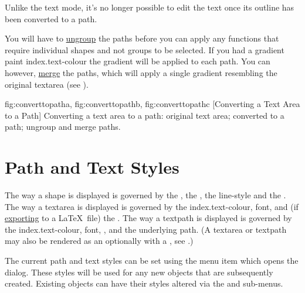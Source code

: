 \begin{information}
Unlike the text  mode, it's no longer possible to
edit the text once its outline has been converted to a path.
\end{information}

You will have to \hyperref[sec:grouping]{ungroup} the
\glspl*{path} before you can apply any functions that require
individual \glspl{shape} and not \glspl{group} to be selected.  If you
had a gradient paint \gls{index.text-colour} the gradient will be
applied to each \gls*{path}. You can however,
\hyperref[sec:mergepaths]{merge} the \glspl*{path}, which will apply
a single gradient resembling the original \gls*{textarea} (see
).

{
  {fig:converttopatha}{}{},
  {fig:converttopathb}{}{},
  {fig:converttopathc}{}{}
}
[Converting a Text Area to a Path]
{Converting a text area to a path:
 original text area;
 converted to a path;
 ungroup and merge paths.}



\chapter{Path and Text Styles}\label{sec:styles}

The way a \gls{shape} is displayed is governed by the 
, the , the 
\gls{line-style} and the . 
The way a \gls{textarea} is displayed is governed by the
\gls{index.text-colour}, \gls{font},  
and (if \hyperref[sec:exportimage]{exporting} to a \LaTeX\ file) the
. The way a \gls{textpath} is displayed is governed
by the \gls{index.text-colour}, \gls{font}, ,
 and the underlying path. (A
\gls*{textarea} or \gls*{textpath} may also be rendered as an
 optionally with a , see
.)


The current path and text styles can be set using the
 menu item which opens the 
dialog. These styles will be used for any new \glspl{object} that
are subsequently created. Existing \glspl{object} can have their
styles altered via the  and 
sub-menus. 

